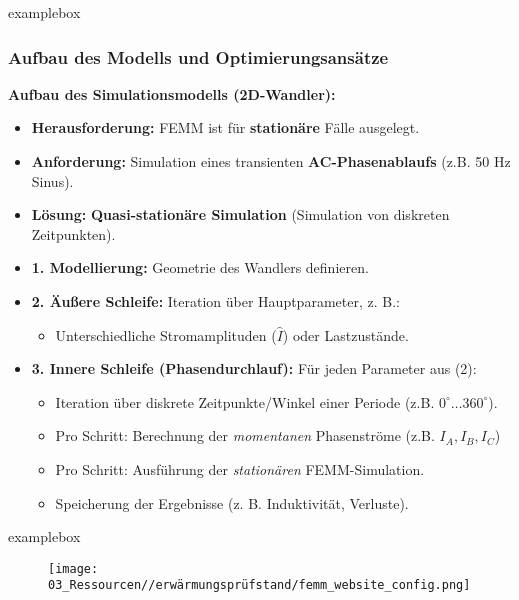 \begin{frame}
    \begin{beamercolorbox}[wd=\textwidth, sep=1ex, rounded=true, shadow=true]{examplebox}
        \frametitle{Aufbau des Modells und Optimierungsansätze}
        \textbf{Aufbau des Simulationsmodells (2D-Wandler):}
        \begin{itemize}
            \item \textbf{Herausforderung:} FEMM ist für \textbf{stationäre} Fälle ausgelegt.
            \item \textbf{Anforderung:} Simulation eines transienten \textbf{AC-Phasenablaufs} (z.B. 50 Hz Sinus).
            \item \textbf{Lösung:} \textbf{Quasi-stationäre Simulation} (Simulation von diskreten Zeitpunkten).

            \item \textbf{1. Modellierung:} Geometrie des Wandlers definieren.

            \item \textbf{2. Äußere Schleife:} Iteration über Hauptparameter, z. B.:
                  \begin{itemize}
                      \item Unterschiedliche Stromamplituden ($\hat{I}$) oder Lastzustände.
                  \end{itemize}

            \item \textbf{3. Innere Schleife (Phasendurchlauf):} Für jeden Parameter aus (2):
                  \begin{itemize}
                      \item Iteration über diskrete Zeitpunkte/Winkel einer Periode (z.B. $0^\circ \dots 360^\circ$).
                      \item Pro Schritt: Berechnung der \textit{momentanen} Phasenströme (z.B. $I_A, I_B, I_C$)
                      \item Pro Schritt: Ausführung der \textit{stationären} FEMM-Simulation.
                      \item Speicherung der Ergebnisse (z. B. Induktivität, Verluste).
                  \end{itemize}
        \end{itemize}
    \end{beamercolorbox}
\end{frame}


\begin{frame}
    \begin{beamercolorbox}[wd=\textwidth, sep=1ex, rounded=true, shadow=true]{examplebox}
        \begin{figure}
            \centering
            \texttt{[image: 03\_Ressourcen//erwärmungsprüfstand/femm\_website\_config.png]}
        \end{figure}
    \end{beamercolorbox}
\end{frame}
